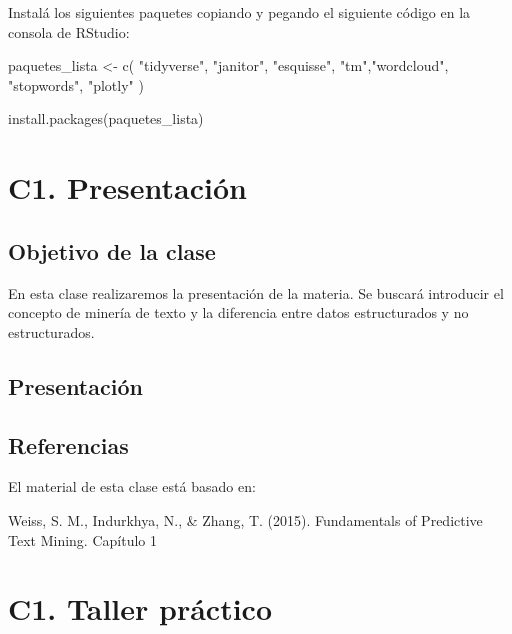 \documentclass[
  letterpaper,
  DIV=11,
  numbers=noendperiod]{scrreprt}
\newenvironment{Shaded}{\begin{snugshade}}{\end{snugshade}}
\newcommand{\FunctionTok}[1]{\textcolor[rgb]{0.28,0.35,0.67}{#1}}
\newcommand{\NormalTok}[1]{\textcolor[rgb]{0.00,0.23,0.31}{#1}}
\newcommand{\OtherTok}[1]{\textcolor[rgb]{0.00,0.23,0.31}{#1}}
\newcommand{\StringTok}[1]{\textcolor[rgb]{0.13,0.47,0.30}{#1}}
\begin{document}
Instalá los siguientes paquetes copiando y pegando el siguiente código
en la consola de RStudio:

\begin{Shaded}
\begin{Highlighting}[]

\NormalTok{paquetes\_lista }\OtherTok{\textless{}{-}} \FunctionTok{c}\NormalTok{(}
  \StringTok{"tidyverse"}\NormalTok{, }\StringTok{"janitor"}\NormalTok{, }\StringTok{"esquisse"}\NormalTok{, }\StringTok{"tm"}\NormalTok{,}\StringTok{"wordcloud"}\NormalTok{, }\StringTok{"stopwords"}\NormalTok{, }\StringTok{"plotly"}
\NormalTok{)}

\FunctionTok{install.packages}\NormalTok{(paquetes\_lista)}
\end{Highlighting}
\end{Shaded}

\chapter{C1. Presentación}\label{c1.-presentaciuxf3n}

\section{\texorpdfstring{\textbf{Objetivo de la
clase}}{Objetivo de la clase}}\label{objetivo-de-la-clase}

En esta clase realizaremos la presentación de la materia. Se buscará
introducir el concepto de minería de texto y la diferencia entre datos
estructurados y no estructurados.

\section{\texorpdfstring{\textbf{Presentación}}{Presentación}}\label{presentaciuxf3n}

\section{\texorpdfstring{\textbf{Referencias}}{Referencias}}\label{referencias}

El material de esta clase está basado en:

Weiss, S. M., Indurkhya, N., \& Zhang, T. (2015). Fundamentals of
Predictive Text Mining. Capítulo 1

\chapter{C1. Taller práctico}\label{c1.-taller-pruxe1ctico}
\end{document}

